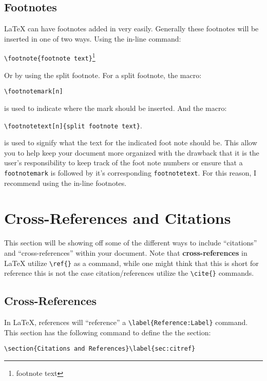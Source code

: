 		\subsection{Footnotes}
			\LaTeX{} can have footnotes added in very easily. 
			Generally these footnotes will be inserted in one of two ways.
			Using the in-line command:
			\begin{Center}
				\lstinline|\footnote{footnote text}|\footnote{footnote text} 
			\end{Center}
			Or by using the split footnote.
			For a split footnote, the macro:
			\begin{Center}
				\lstinline|\footnotemark[n]|\footnotemark{}
			\end{Center}
			is used to indicate where the mark should be inserted.
			And the macro: 
			\begin{Center}
				\lstinline|\footnotetext[n]{split footnote text}|.
			\end{Center}
			is used to signify what the text for the indicated foot note should be.
			This allow you to help keep your document more organized with the drawback that it is the user's responsibility to keep track of the foot note numbers or ensure that a \lstinline|footnotemark| is followed by it's corresponding \lstinline|footnotetext|.
			For this reason, I recommend using the in-line footnotes.
		
			\footnotetext{split footnote text}
		
	\section{Cross-References and Citations}\label{sec:citref}
		This section will be showing off some of the different ways to include \enquote{citations} and \enquote{cross-references} within your document.
		Note that \textbf{cross-references} in \LaTeX{} utilize \lstinline|\ref{}| as a command, while one might think that this is short for reference this is not the case citation/references utilize the \lstinline|\cite{}| commands.
	  
		\subsection{Cross-References}\label{subsec:cross-reference}
			In \LaTeX{}, references will \enquote{reference} a \lstinline|\label{Reference:Label}| command. 
			This section has the following command to define the the section:

			\begin{Center}
				\lstinline|\section{Citations and References}\label{sec:citref}|
			\end{Center}

